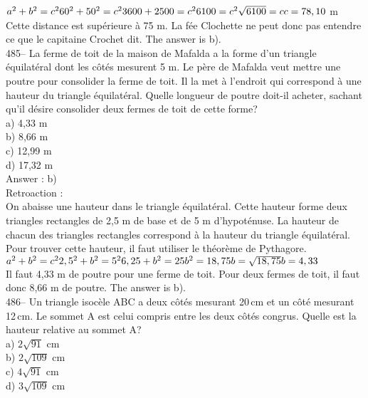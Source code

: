 ﻿\documentclass[letterpaper, 12pt]{article}
\begin{document}
$a^{2}+b^{2}=c^{2}\\
60^{2}+50^{2}=c^{2}\\
3600+2500=c^{2}\\
6100=c^{2}\\
\sqrt{6100}=c\\
c=78,10$ m\\
Cette distance est sup\'erieure \`a 75 m.  La f\'ee Clochette ne peut donc
pas entendre ce que le capitaine Crochet dit.  The answer is b).\\

485--  La ferme de toit de la maison de Mafalda a la forme d'un triangle
\'equilat\'eral dont les c\^ot\'es mesurent 5 m.  Le p\`ere de Mafalda veut
mettre une poutre pour consolider la ferme de toit.  Il la met \`a l'endroit
qui correspond \`a une hauteur du triangle \'equilat\'eral.  Quelle longueur
de poutre doit-il acheter, sachant qu'il d\'esire consolider deux fermes de
toit de cette forme?\\
a) 4,33 m\\
b) 8,66 m\\
c) 12,99 m\\
d) 17,32 m\\

Answer : b)\\

Retroaction :\\
On abaisse une hauteur dans le triangle \'equilat\'eral.  Cette hauteur
forme deux triangles rectangles de 2,5 m de base et de 5 m d'hypot\'enuse.
La hauteur de chacun des triangles rectangles correspond \`a la hauteur du
triangle \'equilat\'eral.  Pour trouver cette hauteur, il faut utiliser le
th\'eor\`eme de Pythagore.\\

$a^{2}+b^{2}=c^{2}\\
2,5^{2}+b^{2}=5^{2}\\
6,25+b^{2}=25\\
b^{2}=18,75\\
b=\sqrt{18,75}\\
b=4,33$\\
Il faut 4,33 m de poutre pour une ferme de toit.  Pour deux fermes de toit,
il faut donc 8,66 m de poutre.  The answer is b).\\


486-- Un triangle isoc\`ele ABC a deux c\^ot\'es mesurant 20\,cm et un
c\^ot\'e mesurant 12\,cm.  Le sommet A est celui compris entre les deux
c\^ot\'es congrus.  Quelle est la hauteur relative au sommet A?\\
a) $2\sqrt{91}$ cm\\
b) $2\sqrt{109}$ cm\\
c) $4\sqrt{91}$ cm\\
d) $3\sqrt{109}$ cm\\
\end{document}
